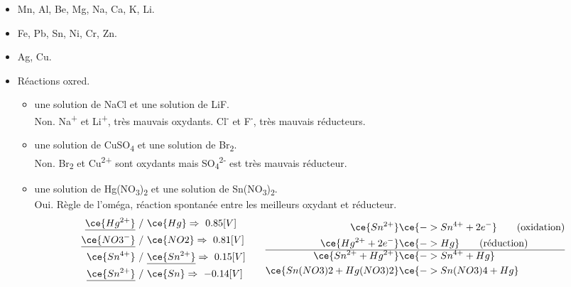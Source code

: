 \documentclass[
  11pt,
  french,
  a4paper,
  openany]{book}
\providecommand{\tightlist}{%
  \setlength{\itemsep}{0pt}\setlength{\parskip}{0pt}}
\begin{document}
\begin{Answer}

\begin{itemize}
\tightlist
\item
  Mn, Al, Be, Mg, Na, Ca, K, Li.
\item
  Fe, Pb, Sn, Ni, Cr, Zn.
\item
  Ag, Cu.
\item
  Réactions oxred.

  \begin{itemize}
  \tightlist
  \item
    une solution de NaCl et une solution de LiF.\\
    Non. Na\textsuperscript{+} et Li\textsuperscript{+}, très mauvais oxydants. Cl\textsuperscript{-} et F\textsuperscript{-}, très mauvais réducteurs.
  \item
    une solution de CuSO\textsubscript{4} et une solution de Br\textsubscript{2}.\\
    Non. Br\textsubscript{2} et Cu\textsuperscript{2+} sont oxydants mais SO\textsubscript{4}\textsuperscript{2-} est très mauvais réducteur.
  \item
    une solution de Hg(NO\textsubscript{3})\textsubscript{2} et une solution de Sn(NO\textsubscript{3})\textsubscript{2}.\\
    Oui. Règle de l'oméga, réaction spontanée entre les meilleurs oxydant et réducteur.\\
    \[
      \begin{split}
    \underline{\ce{Hg^{2+}}}\ & /\    \ce{Hg} \Rightarrow\ 0.85 [V] \\
    \underline{\ce{NO3^{-}}}\ & /\    \ce{NO2} \Rightarrow\ 0.81 [V] \\
    \ce{Sn^{4+}}\ & /\ \underline{\ce{Sn^{2+}}} \Rightarrow\ 0.15 [V] \\
    \underline{\ce{Sn^{2+}}}\ & /\ \ce{Sn} \Rightarrow\ -0.14 [V]
      \end{split}
      \qquad
      \begin{split}
      \ce{Sn^{2+}} & \ce{ -> Sn^{4+} + 2 e^-} \qquad \text{(oxidation)} \\
      \ce{Hg^{2+} + 2 e^-} & \ce{ -> Hg} \qquad \text{(réduction)} \\
      \hline
      \ce{Sn^{2+} + Hg^{2+}} & \ce{ -> Sn^{4+} + Hg} \\
      \ce{Sn(NO3)2 + Hg(NO3)2} & \ce{ -> Sn(NO3)4 + Hg}
      \end{split}
      \]
  \end{itemize}
\end{itemize}


\end{Answer}
\end{document}
